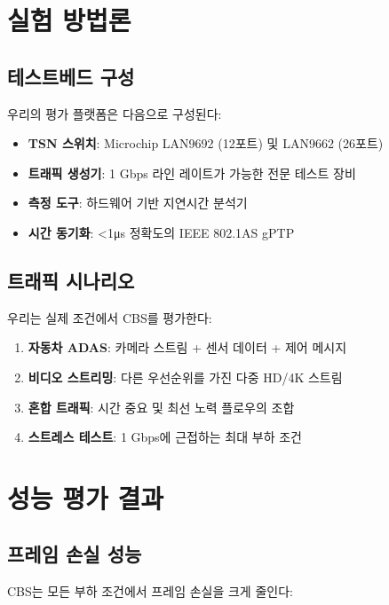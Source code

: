 \documentclass[12pt, a4paper]{article}
\begin{document}
\section{실험 방법론}

\subsection{테스트베드 구성}

우리의 평가 플랫폼은 다음으로 구성된다:

\begin{itemize}
    \item \textbf{TSN 스위치}: Microchip LAN9692 (12포트) 및 LAN9662 (26포트)
    \item \textbf{트래픽 생성기}: 1 Gbps 라인 레이트가 가능한 전문 테스트 장비
    \item \textbf{측정 도구}: 하드웨어 기반 지연시간 분석기
    \item \textbf{시간 동기화}: <1μs 정확도의 IEEE 802.1AS gPTP
\end{itemize}

\subsection{트래픽 시나리오}

우리는 실제 조건에서 CBS를 평가한다:

\begin{enumerate}
    \item \textbf{자동차 ADAS}: 카메라 스트림 + 센서 데이터 + 제어 메시지
    \item \textbf{비디오 스트리밍}: 다른 우선순위를 가진 다중 HD/4K 스트림
    \item \textbf{혼합 트래픽}: 시간 중요 및 최선 노력 플로우의 조합
    \item \textbf{스트레스 테스트}: 1 Gbps에 근접하는 최대 부하 조건
\end{enumerate}

\section{성능 평가 결과}

\subsection{프레임 손실 성능}

CBS는 모든 부하 조건에서 프레임 손실을 크게 줄인다:
\end{document}
